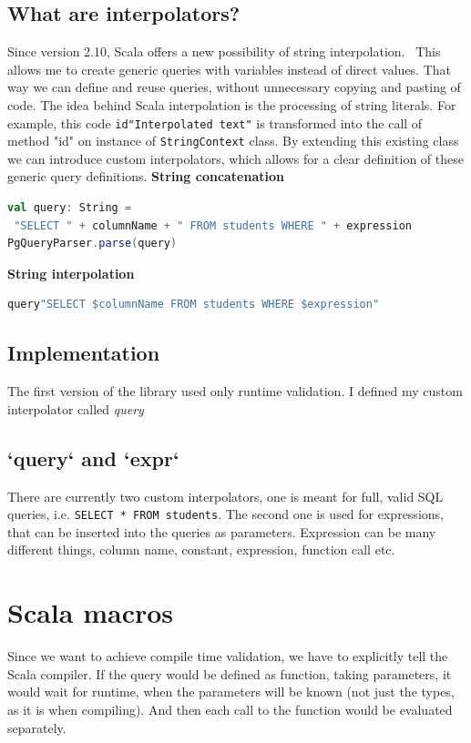 \documentclass[thesis=B,english]{FITthesis}[2019/12/23]
\begin{document}
\subsection{What are interpolators?}
Since version 2.10, Scala offers a new possibility of string interpolation.~\cite{String interpolation} This allows me to create generic queries with variables instead of direct values. That way we can define and reuse queries, without unnecessary copying and pasting of code. The idea behind Scala interpolation is the processing of string literals. For example, this code  \verb|id"Interpolated text"| is transformed into the call of method "id" on instance of \texttt{StringContext} class. By extending this existing class we can introduce custom interpolators, which allows for a clear definition of these generic query definitions.
\bigskip
\newline
\textbf{String concatenation}
\begin{lstlisting}[language=scala, showstringspaces=false]
val query: String = 
 "SELECT " + columnName + " FROM students WHERE " + expression
PgQueryParser.parse(query)
\end{lstlisting}
\bigskip
\textbf{String interpolation}
\begin{lstlisting}[language=scala, showstringspaces=false]
query"SELECT $columnName FROM students WHERE $expression"
\end{lstlisting}

\subsection{Implementation}
The first version of the library used only runtime validation. I defined my custom interpolator called \textit{query}

\subsection{`query` and `expr`}
There are currently two custom interpolators, one is meant for full, valid SQL queries, i.e. \texttt{SELECT * FROM students}. The second one is used for expressions, that can be inserted into the queries as parameters. Expression can be many different things, column name, constant, expression, function call etc.

\section{Scala macros}
Since we want to achieve compile time validation, we have to explicitly tell the Scala compiler. If the query would be defined as function, taking parameters, it would wait for runtime, when the parameters will be known (not just the types, as it is when compiling). And then each call to the function would be evaluated separately.
\end{document}
